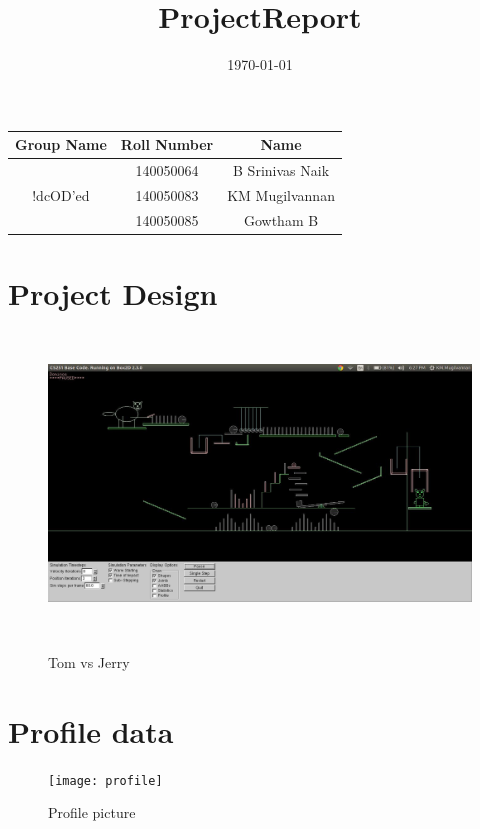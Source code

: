 \documentclass{article}
\title{ProjectReport}
\date{\today}
\begin{document}
\maketitle

\begin{center}
\begin{tabular}{|c|c|c|}
\hline 
Group Name & Roll Number & Name \\
\hline
\multirow{3}{*}{!dcOD'ed} & 140050064 & B Srinivas Naik \\
\cline{2-3}
 & 140050083 & KM Mugilvannan \\
 \cline{2-3}
 & 140050085 & Gowtham B \\
 \hline
\end{tabular}
\end{center}

\newpage
\section*{Project Design}
\begin{figure}[h] 
\caption{Tom vs Jerry}
\begin{center}
\includegraphics[height=8cm,scale=0.40]{Toms_turn}
\label{TomNjerry}
\end{center}
\end{figure}
\section*{Profile data} 
\begin{figure}[h] 
\caption{Profile picture}
\begin{center}
\texttt{[image: profile]}
\label{profile}
\end{center}
\end{figure}
\end{document}
